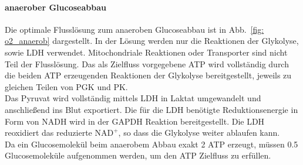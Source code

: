\paragraph{anaerober Glucoseabbau}
Die optimale Flusslösung zum anaeroben Glucoseabbau ist in Abb.~\ref{fig: o2_anaerob} dargestellt. In der Lösung werden nur die Reaktionen der Glykolyse, sowie LDH verwendet. Mitochondriale Reaktionen oder Transporter sind nicht Teil der Flusslösung. Das als Zielfluss vorgegebene ATP wird vollständig durch die beiden ATP erzeugenden Reaktionen der Glykolyse bereitgestellt, jeweils zu gleichen Teilen von PGK und PK.\\
Das Pyruvat wird vollständig mittels LDH in Laktat umgewandelt und anschließend ins Blut exportiert. Die für die LDH benötigte Reduktionsenergie in Form von NADH wird in der GAPDH Reaktion bereitgestellt. Die LDH reoxidiert das reduzierte $\text{NAD}^+$, so dass die Glykolyse weiter ablaufen kann.\\
Da ein Glucosemolekül beim anaerobem Abbau exakt 2 ATP erzeugt, müssen 0.5 Glucosemoleküle aufgenommen werden, um den ATP Zielfluss zu erfüllen. 

